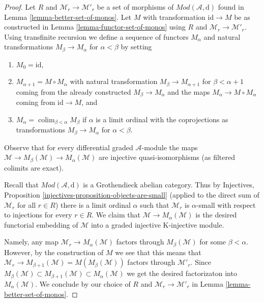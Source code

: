 \documentclass{stacks-project}
\theoremstyle{plain}
\theoremstyle{definition}
\theoremstyle{remark}
\numberwithin{equation}{subsection}
\def\colim{\mathop{\mathrm{colim}}\nolimits}
\begin{document}
\begin{proof}
Let $R$ and $\mathcal{M}_r \to \mathcal{M}'_r$ be a set of
morphisms of $\textit{Mod}(\mathcal{A}, \text{d})$ found in
Lemma \ref{lemma-better-set-of-monos}.
Let $M$ with transformation $\text{id} \to M$
be as constructed in Lemma \ref{lemma-functor-set-of-monos}
using $R$ and $\mathcal{M}_r \to \mathcal{M}'_r$.
Using transfinite recursion we define a sequence of functors
$M_\alpha$ and natural transformations $M_\beta \to M_\alpha$
for $\alpha < \beta$ by setting
\begin{enumerate}
\item $M_0 = \text{id}$,
\item $M_{\alpha + 1} = M \circ M_\alpha$ with natural transformation
$M_\beta \to M_{\alpha + 1}$ for $\beta < \alpha + 1$
coming from the already constructed $M_\beta \to M_\alpha$ and the
maps $M_\alpha \to M \circ M_\alpha$ coming from $\text{id} \to M$, and
\item $M_\alpha = \colim_{\beta < \alpha} M_\beta$ if $\alpha$
is a limit ordinal with the coprojections as transformations
$M_\beta \to M_\alpha$ for $\alpha < \beta$.
\end{enumerate}
Observe that for every differential graded $\mathcal{A}$-module the maps
$\mathcal{M} \to M_\beta(\mathcal{M}) \to M_\alpha(\mathcal{M})$
are injective quasi-isomorphisms (as filtered colimits are exact).

\medskip\noindent
Recall that $\textit{Mod}(\mathcal{A}, \text{d})$ is a Grothendieck
abelian category. Thus by
Injectives, Proposition \ref{injectives-proposition-objects-are-small}
(applied to the direct sum of $\mathcal{M}_r$ for all $r \in R$)
there is a limit ordinal $\alpha$ such that $\mathcal{M}_r$ is $\alpha$-small
with respect to injections for every $r \in R$.
We claim that $\mathcal{M} \to M_\alpha(\mathcal{M})$ is
the desired functorial embedding of $\mathcal{M}$ into a
graded injective K-injective module.

\medskip\noindent
Namely, any map $\mathcal{M}_r \to M_\alpha(\mathcal{M})$
factors through $M_\beta(\mathcal{M})$ for some $\beta < \alpha$.
However, by the construction of $M$ we see that this means
that $\mathcal{M}_r \to M_{\beta + 1}(\mathcal{M}) = M(M_\beta(\mathcal{M}))$
factors through $\mathcal{M}'_r$. Since
$M_\beta(\mathcal{M}) \subset  M_{\beta + 1}(\mathcal{M})
\subset M_\alpha(\mathcal{M})$ we get the desired factorizaton
into $M_\alpha(\mathcal{M})$. We conclude by our choice of
$R$ and $\mathcal{M}_r \to \mathcal{M}'_r$ in
Lemma \ref{lemma-better-set-of-monos}.
\end{proof}
\end{document}
